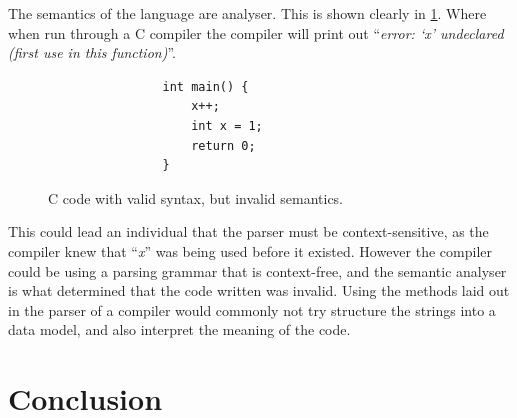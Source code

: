 The semantics of the language are analyser. This is shown clearly in \ref{fig:InvalidC}. Where when run through a C compiler the compiler will print out ``\emph{error: \lq{}x\rq{} undeclared (first use in this function)}''. 

\begin{figure}[ht!]
    \begin{verbatim}
                int main() {
                    x++;
                    int x = 1;
                    return 0;
                }
    \end{verbatim}
    \caption{C code with valid syntax, but invalid semantics.}
    \label{fig:InvalidC}
\end{figure}

This could lead an individual that the parser must be context-sensitive, as the compiler knew that ``\emph{x}'' was being used before it existed. However the compiler could be using a parsing grammar that is context-free, and the semantic analyser is what determined that the code written was invalid. Using the methods laid out in \autocite{DragonBook} the parser of a compiler would commonly not try structure the strings into a data model, and also interpret the meaning of the code.



\newpage
\section{Conclusion}
\newpage
